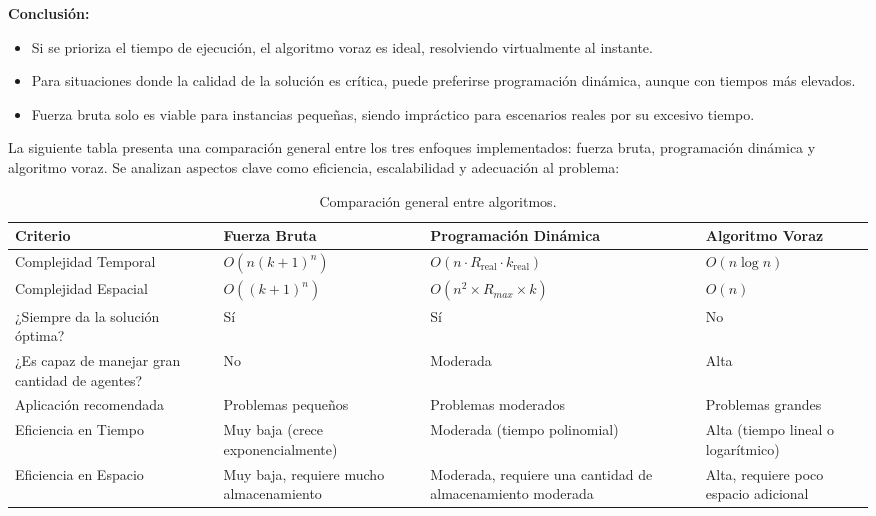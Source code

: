 \textbf{Conclusión:}
\begin{itemize}
    \item Si se prioriza el tiempo de ejecución, el algoritmo voraz es ideal, resolviendo virtualmente al instante.
    \item Para situaciones donde la calidad de la solución es crítica, puede preferirse programación dinámica, aunque con tiempos más elevados.
    \item Fuerza bruta solo es viable para instancias pequeñas, siendo impráctico para escenarios reales por su excesivo tiempo.
\end{itemize}

La siguiente tabla presenta una comparación general entre los tres enfoques implementados: fuerza bruta, programación dinámica y algoritmo voraz. Se analizan aspectos clave como eficiencia, escalabilidad y adecuación al problema:

\begin{table}[H]
    \centering
    \renewcommand{\arraystretch}{1.5}
    \begin{tabular}{C{4cm} C{3cm} C{3.5cm} C{3.5cm}}
        \toprule
        \textbf{Criterio}                              & \textbf{Fuerza Bruta}                   & \textbf{Programación Dinámica} & \textbf{Algoritmo Voraz}              \\
        \midrule
        Complejidad Temporal                           & \( O(n(k+1)^n) \)                       & \(O(n \cdot R_{\text{real}} \cdot k_{\text{real}})\)                 & \( O(n \log n) \)                     \\
        Complejidad Espacial                           & \( O((k+1)^n) \)                        & \( O(n^2 \times R_{max} \times k)\)                 & \( O(n) \)                            \\
        ¿Siempre da la solución óptima?                & Sí                                      & Sí                             & No                                    \\
        ¿Es capaz de manejar gran cantidad de agentes? & No                                      & Moderada                 & Alta                                  \\
        Aplicación recomendada                         & Problemas pequeños                      & Problemas moderados                      & Problemas grandes                     \\
        Eficiencia en Tiempo                           & Muy baja (crece exponencialmente)       & Moderada (tiempo polinomial)                      & Alta (tiempo lineal o logarítmico)    \\
        Eficiencia en Espacio                          & Muy baja, requiere mucho almacenamiento & Moderada, requiere una cantidad de almacenamiento moderada                      & Alta, requiere poco espacio adicional \\
        \bottomrule
    \end{tabular}
    \caption{Comparación general entre algoritmos.}
\end{table}